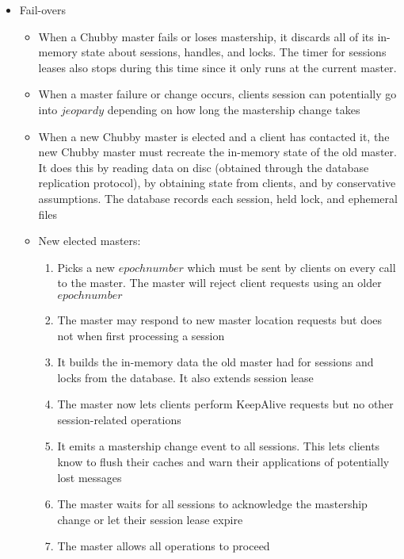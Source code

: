 \documentclass[a4paper]{article}
\begin{document}
\begin{itemize}
\item Fail-overs
\begin{itemize}
\item When a Chubby master fails or loses mastership, it discards all of its in-memory state about sessions, handles, and locks. The timer for sessions leases also stops during this time since it only runs at the current master.

\item When a master failure or change occurs, clients session can potentially go into $jeopardy$ depending on how long the mastership change takes

\item When a new Chubby master is elected and a client has contacted it, the new Chubby master must recreate the in-memory state of the old master. It does this by reading data on disc (obtained through the database replication protocol), by obtaining state from clients, and by conservative assumptions. The database records each session, held lock, and ephemeral files

\item New elected masters:
\begin{enumerate}
\item Picks a new $epoch number$ which must be sent by clients on every call to the master. The master will reject client requests using an older $epoch number$

\item The master may respond to new master location requests but does not when first processing a session

\item It builds the in-memory data the old master had for sessions and locks from the database. It also extends session lease

\item The master now lets clients perform KeepAlive requests but no other session-related operations

\item It emits a mastership change event to all sessions. This lets clients know to flush their caches and warn their applications of potentially lost messages

\item The master waits for all sessions to acknowledge the mastership change or let their session lease expire

\item The master allows all operations to proceed


\end{enumerate}
\end{itemize}
\end{itemize}
\end{document}
